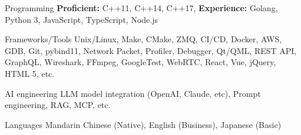 
\begin{cvskills}
    \cvskill
    {Programming} %
    {
      \textbf{Proficient:} C++11, C++14, C++17, \textbf{Experience:} Golang, Python 3, JavaScript,
      TypeScript, Node.js
    } %

      \cvskill
      {Frameworks/Tools} %
      {
        Unix/Linux, Make, CMake, ZMQ, CI/CD, Docker, AWS, GDB, Git, pybind11, Network Packet, Profiler, Debugger,  \newline
        Qt/QML, REST API, GraphQL, Wireshark, FFmpeg, GoogleTest, WebRTC, React, Vue, jQuery, HTML 5, etc.
      } %

       \cvskill
      {AI engineering} %
      {
        LLM model integration (OpenAI, Claude, etc), Prompt engineering, RAG, MCP, etc.
      } %

      \cvskill
        {Languages} %
        {Mandarin Chinese (Native), English (Business), Japanese (Basic)} %
    
\end{cvskills}
